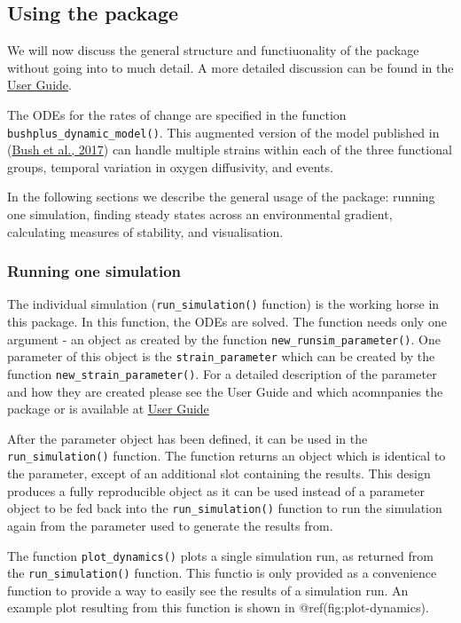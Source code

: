 \documentclass[]{elsarticle} %
\begin{document}
\hypertarget{runsim}{%
\subsection{Using the package}\label{runsim}}

We will now discuss the general structure and functiuonality of the
package without going into to much detail. A more detailed discussion
can be found in the \href{LINK_NEEDED}{User Guide}.

The ODEs for the rates of change are specified in the function
\texttt{bushplus\_dynamic\_model()}. This augmented version of the model
published in (\protect\hyperlink{ref-Bush2017}{Bush et al., 2017}) can
handle multiple strains within each of the three functional groups,
temporal variation in oxygen diffusivity, and events.

In the following sections we describe the general usage of the package:
running one simulation, finding steady states across an environmental
gradient, calculating measures of stability, and visualisation.

\hypertarget{running-one-simulation}{%
\subsubsection{Running one simulation}\label{running-one-simulation}}

The individual simulation (\texttt{run\_simulation()} function) is the
working horse in this package. In this function, the ODEs are solved.
The function needs only one argument - an object as created by the
function \texttt{new\_runsim\_parameter()}. One parameter of this object
is the \texttt{strain\_parameter} which can be created by the function
\texttt{new\_strain\_parameter()}. For a detailed description of the
parameter and how they are created please see the User Guide and which
acomnpanies the package or is available at \href{@LINK_NEEDED}{User
Guide}

After the parameter object has been defined, it can be used in the
\texttt{run\_simulation()} function. The function returns an object
which is identical to the parameter, except of an additional slot
containing the results. This design produces a fully reproducible object
as it can be used instead of a parameter object to be fed back into the
\texttt{run\_simulation()} function to run the simulation again from the
parameter used to generate the results from.

The function \texttt{plot\_dynamics()} plots a single simulation run, as
returned from the \texttt{run\_simulation()} function. This functio is
only provided as a convenience function to provide a way to easily see
the results of a simulation run. An example plot resulting from this
function is shown in @ref(fig:plot-dynamics).
\end{document}
